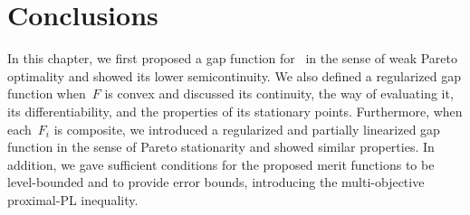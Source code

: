 \documentclass[../main]{subfiles}
\begin{document}
\section{Conclusions} 
In this chapter, we first proposed a gap function for~ in the sense of weak Pareto optimality and showed its lower semicontinuity.
We also defined a regularized gap function when~$F$ is convex and discussed its continuity, the way of evaluating it, its differentiability, and the properties of its stationary points.
Furthermore, when each~$F_i$ is composite, we introduced a regularized and partially linearized gap function in the sense of Pareto stationarity and showed similar properties.
In addition, we gave sufficient conditions for the proposed merit functions to be level-bounded and to provide error bounds, introducing the multi-objective proximal-PL inequality.
\end{document}
